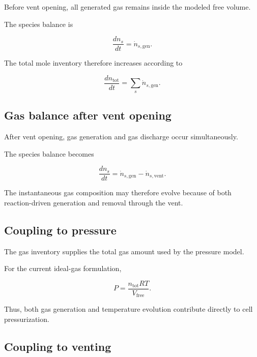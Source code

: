 Before vent opening, all generated gas remains inside the modeled free
volume.

The species balance is

\begin{equation}
    \frac{dn_s}{dt}
    =
    \dot{n}_{s,\mathrm{gen}}.
    \label{eq:closed_gas_balance}
\end{equation}

The total mole inventory therefore increases according to

\begin{equation}
    \frac{dn_{\mathrm{tot}}}{dt}
    =
    \sum_s
    \dot{n}_{s,\mathrm{gen}}.
\end{equation}


\subsection{Gas balance after vent opening}

After vent opening, gas generation and gas discharge occur
simultaneously.

The species balance becomes

\begin{equation}
    \frac{dn_s}{dt}
    =
    \dot{n}_{s,\mathrm{gen}}
    -
    \dot{n}_{s,\mathrm{vent}}.
    \label{eq:open_gas_balance}
\end{equation}

The instantaneous gas composition may therefore evolve because of both
reaction-driven generation and removal through the vent.


\subsection{Coupling to pressure}

The gas inventory supplies the total gas amount used by the pressure
model.

For the current ideal-gas formulation,

\begin{equation}
    P
    =
    \frac{
        n_{\mathrm{tot}} R T
    }{
        V_{\mathrm{free}}
    }.
    \label{eq:gases_pressure_coupling}
\end{equation}

Thus, both gas generation and temperature evolution contribute directly
to cell pressurization.


\subsection{Coupling to venting}

